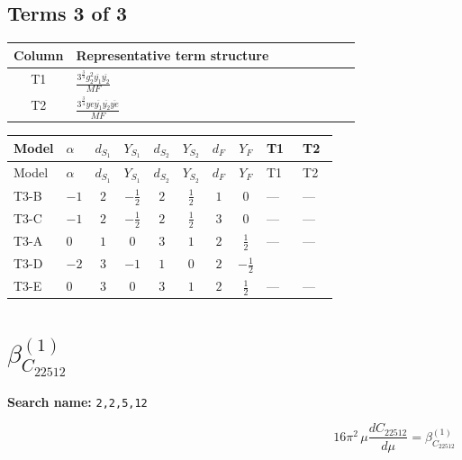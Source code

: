 \documentclass[8pt]{article}
\begin{document}
\begin{landscape}
\subsection*{Terms 3 of 3}
\begin{center}
\begin{tabular}{@{}c >{\raggedright\arraybackslash}p{0.82\linewidth}@{}}
\toprule
Column & Representative term structure \\
\midrule
T1 & \(\displaystyle \frac{3^{\frac{3}{4}} g_{2}^{2} \overline{y_{1}} \overline{y_{2}}}{MF}\) \\
\midrule
T2 & \(\displaystyle \frac{3^{\frac{3}{4}} ye \overline{y_{1}} \overline{y_{2}} \overline{ye}}{MF}\) \\
\midrule
\bottomrule
\end{tabular}
\end{center}
\smallskip
\tiny
\begin{longtable}{@{}llcccccc >{\raggedright\arraybackslash}p{0.21\linewidth} >{\raggedright\arraybackslash}p{0.21\linewidth}@{}}
\toprule
Model & $\alpha$ & $d_{S_1}$ & $Y_{S_1}$ & $d_{S_2}$ & $Y_{S_2}$ & $d_F$ & $Y_F$ & T1 & T2 \\
\midrule
\endfirsthead
\toprule
Model & $\alpha$ & $d_{S_1}$ & $Y_{S_1}$ & $d_{S_2}$ & $Y_{S_2}$ & $d_F$ & $Y_F$ & T1 & T2 \\
\midrule
\endhead
T3-B & $-1$ & $2$ & $-\frac{1}{2}$ & $2$ & $\frac{1}{2}$ & $1$ & $0$ & --- & --- \\
\midrule
T3-C & $-1$ & $2$ & $-\frac{1}{2}$ & $2$ & $\frac{1}{2}$ & $3$ & $0$ & --- & --- \\
\midrule
T3-A & $0$ & $1$ & $0$ & $3$ & $1$ & $2$ & $\frac{1}{2}$ & --- & --- \\
\midrule
T3-D & $-2$ & $3$ & $-1$ & $1$ & $0$ & $2$ & $-\frac{1}{2}$ & \scriptsize\adjustbox{max width=\linewidth}{$\begin{gathered} \frac{11 \cdot 3^{\frac{3}{4}} g_{2}^{2} \overline{y_{1}} \overline{y_{2}}}{8 MF}\end{gathered}$} & \scriptsize\adjustbox{max width=\linewidth}{$\begin{gathered} - \frac{3^{\frac{3}{4}} ye \overline{y_{1}} \overline{y_{2}} \overline{ye}}{12 MF}\end{gathered}$} \\
\midrule
T3-E & $0$ & $3$ & $0$ & $3$ & $1$ & $2$ & $\frac{1}{2}$ & --- & --- \\
\midrule
\bottomrule
\end{longtable}
\clearpage
\section*{$\beta_{C_{22512}}^{(1)}$}
\noindent\textbf{Search name: }\texttt{2,2,5,12}\par\smallskip
\[16\pi^2\,\mu\frac{d C_{22512}}{d\mu}=\beta_{C_{22512}}^{(1)}\]

\end{landscape}
\end{document}
